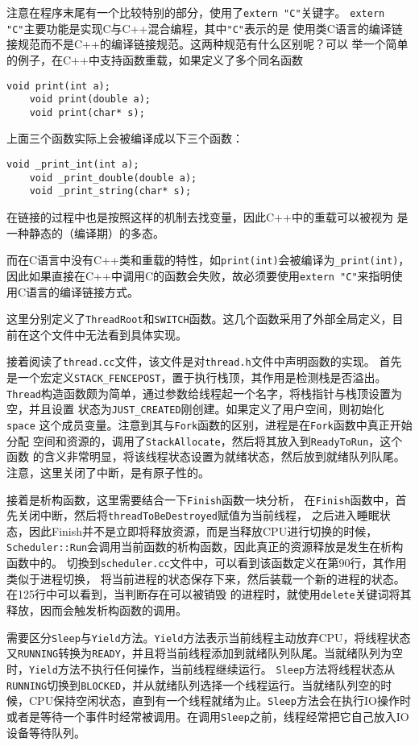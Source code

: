 注意在程序末尾有一个比较特别的部分，使用了\texttt{extern "C"}关键字。
\texttt{extern "C"}主要功能是实现C与C++混合编程，其中\texttt{"C"}表示的是
使用类C语言的编译链接规范而不是C++的编译链接规范。这两种规范有什么区别呢？可以
举一个简单的例子，在C++中支持函数重载，如果定义了多个同名函数
\begin{lstlisting}[style=customcpp]
    void print(int a);
    void print(double a);
    void print(char* s);
\end{lstlisting}
上面三个函数实际上会被编译成以下三个函数：
\begin{lstlisting}[style=customcpp]
    void _print_int(int a);
    void _print_double(double a);
    void _print_string(char* s);
\end{lstlisting}
在链接的过程中也是按照这样的机制去找变量，因此C++中的重载可以被视为
是一种静态的（编译期）的多态。

而在C语言中没有C++类和重载的特性，如\texttt{print(int)}会被编译为\texttt{\_print(int)}，
因此如果直接在C++中调用C的函数会失败，故必须要使用\texttt{extern "C"}来指明使用C语言的编译链接方式。

这里分别定义了\texttt{ThreadRoot}和\texttt{SWITCH}函数。这几个函数采用了外部全局定义，目前在这个文件中无法看到具体实现。

接着阅读了\texttt{thread.cc}文件，该文件是对\texttt{thread.h}文件中声明函数的实现。
首先是一个宏定义\texttt{STACK\_FENCEPOST}，置于执行栈顶，其作用是检测栈是否溢出。
\texttt{Thread}构造函数颇为简单，通过参数给线程起一个名字，将栈指针与栈顶设置为空，并且设置
状态为\texttt{JUST\_CREATED}刚创建。如果定义了用户空间，则初始化\texttt{space}
这个成员变量。注意到其与\texttt{Fork}函数的区别，进程是在\texttt{Fork}函数中真正开始分配
空间和资源的，调用了\texttt{StackAllocate}，然后将其放入到\texttt{ReadyToRun}，这个函数
的含义非常明显，将该线程状态设置为就绪状态，然后放到就绪队列队尾。注意，这里关闭了中断，是有原子性的。

接着是析构函数，这里需要结合一下\texttt{Finish}函数一块分析，
在\texttt{Finish}函数中，首先关闭中断，然后将\texttt{threadToBeDestroyed}赋值为当前线程，
之后进入睡眠状态，因此Finish并不是立即将释放资源，而是当释放CPU进行切换的时候，
\texttt{Scheduler::Run}会调用当前函数的析构函数，因此真正的资源释放是发生在析构函数中的。
切換到\texttt{scheduler.cc}文件中，可以看到该函数定义在第90行，其作用类似于进程切换，
将当前进程的状态保存下来，然后装载一个新的进程的状态。在125行中可以看到，当判断存在可以被销毁
的进程时，就使用\texttt{delete}关键词将其释放，因而会触发析构函数的调用。

需要区分\texttt{Sleep}与\texttt{Yield}方法。\texttt{Yield}方法表示当前线程主动放弃CPU，将线程状态
又\texttt{RUNNING}转换为\texttt{READY}，并且将当前线程添加到就绪队列队尾。当就绪队列为空时，\texttt{Yield}方法不执行任何操作，当前线程继续运行。
\texttt{Sleep}方法将线程状态从\texttt{RUNNING}切换到\texttt{BLOCKED}，并从就绪队列选择一个线程运行。当就绪队列空的时候，CPU保持空闲状态，直到有一个线程就绪为止。\texttt{Sleep}方法会在执行IO操作时或者是等待一个事件时经常被调用。在调用\texttt{Sleep}之前，线程经常把它自己放入IO设备等待队列。

